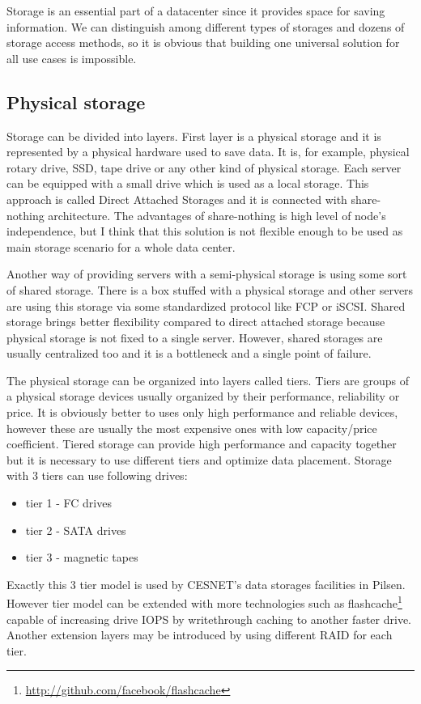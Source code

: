

Storage is an essential part of a datacenter since it provides space for saving information. We can distinguish among different types of storages and dozens of storage access methods, so it is obvious that building one universal solution for all use cases is impossible. 

\subsection{Physical storage}
Storage can be divided into layers. First layer is a physical storage and it is represented by a physical hardware used to save data. It is, for example, physical rotary drive, \Ac{SSD}, tape drive or any other kind of physical storage. Each server can be equipped with a small drive which is used as a local storage. This approach is called Direct Attached Storages and it is connected with share-nothing architecture. The advantages of share-nothing is high level of node's independence, but I think that this solution is not flexible enough to be used as main storage scenario for a whole data center.

Another way of providing servers with a semi-physical storage is using some sort of shared storage. There is a box stuffed with a physical storage and other servers are using this storage via some standardized protocol like \Ac{FCP} or \Ac{iSCSI}. Shared storage brings better flexibility compared to direct attached storage because physical storage is not fixed to a single server. However, shared storages are usually centralized too and it is a bottleneck and a single point of failure.

The physical storage can be organized into layers called tiers. Tiers are groups of a physical storage devices usually organized by their performance, reliability or price. It is obviously better to uses only high performance and reliable devices, however these are usually the most expensive ones with low capacity/price coefficient. Tiered storage can provide high performance and capacity together but it is necessary to use different tiers and optimize data placement. Storage with 3 tiers can use following drives:
\begin{itemize}
	\item tier 1 - \Ac{FC} drives
	\item tier 2 - \Ac{SATA} drives
	\item tier 3 - magnetic tapes
\end{itemize}
Exactly this 3 tier model is used by CESNET's data storages facilities in Pilsen. However tier model can be extended with more technologies such as flashcache\footnote{\url{http://github.com/facebook/flashcache}} capable of increasing drive \Ac{IOPS} by writethrough caching to another faster drive. Another extension layers may be introduced by using different \Ac{RAID} for each tier.

